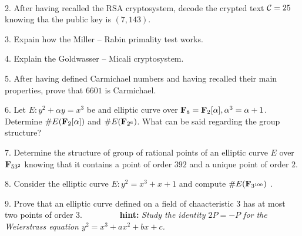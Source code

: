 \ \dotfill\ \bigskip\bigskip\bigskip

\item{2.} After having recalled the RSA cryptosystem, decode the crypted text ${\cal C}=25$ 
knowing tha the public key is $(7,143)$. 
\vfill\eject\ \vskip-2cm

\item{3.} Expain how the Miller -- Rabin primality test works.\vfill

\item{4.} Explain the Goldwasser -- Micali cryptosystem.\vfill\eject\ \vskip-2cm


\item{5.} After having defined Carmichael numbers and having recalled their main properties, prove that 
$6601$ is Carmichael.
\vfill

\item{6.} Let $E: y^2+\alpha y=x^3$ be and elliptic curve over ${\bf F}_8={\bf F}_2[\alpha], \alpha^3=\alpha+1$. Determine
$\#E({\bf F}_2[\alpha])$ and $\#E({\bf F}_{2^6})$. What can be said regarding the group structure?
\vfill\eject\ \vskip-2cm

\item{7.} Determine the structure of group of rational points of an elliptic curve  $E$ over ${\bf F}_{53^2}$ knowing that
it contains a point of order $392$ and a unique point of order $2$.\vfill\vfill

\item{8.} Consider the elliptic curve $E: y^2=x^3+x+1$ and compute $\#E({\bf F}_{3^{100}})$ .\vfill\vfill

\item{9.} Prove that an elliptic curve defined on a field of chaacteristic  $3$ has at most two points of order $3$.\hfill\break 
$\ {}\qquad\qquad$\hfill{\bf hint:} \it Study the identity 
$2P=-P$ for the Weierstrass equation $y^2=x^3+ax^2+bx+c$.
\vfil\ \vst\bye
